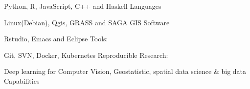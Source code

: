 \begin{cventries}
  \cventry
    {Python, R, JavaScript, C++ and Haskell}
    {Languages}
    { }
    { }
    {
      \begin{cvitems}
      \end{cvitems}
    }
    \vspace{-25}
\end{cventries}
\begin{cventries}
  \cventry
    {Linux(Debian), Qgis, GRASS and SAGA GIS}
    {Software}
    { }
    { }
    {
      \begin{cvitems}
      \end{cvitems}
    }
    \vspace{-15}
\end{cventries}
\begin{cventries}
\vspace{-4mm}
  \cventry
    {Rstudio, Emacs and Eclipse}
    {Tools:}
    { }
    { }
    {
      \begin{cvitems}
      \end{cvitems}
    }
    \vspace{-20}
\end{cventries}
\begin{cventries}
  \cventry
    {Git, SVN, Docker, Kubernetes}
    {Reproducible Research:}
    { }
    { }
    {
      \begin{cvitems}
      \end{cvitems}
    }
    \vspace{-20}
\end{cventries}
\begin{cventries}
  \cventry
    {Deep learning for Computer Vision, Geostatistic, spatial data science \& big data}
    {Capabilities}
    { }
    { }
    {
      \begin{cvitems}
      \end{cvitems}
    }
    
\end{cventries}
